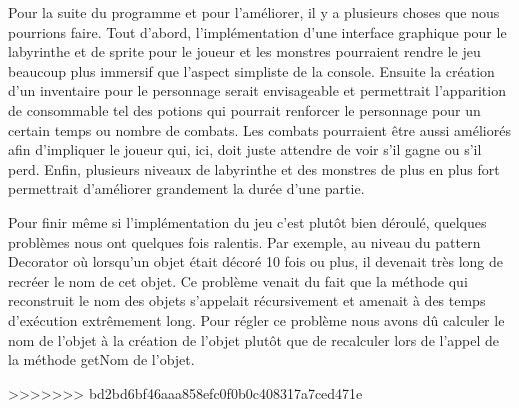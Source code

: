 \documentclass[a4paper]{article}
\begin{document}
Pour la suite du programme et pour l'améliorer, il y a plusieurs choses que nous pourrions faire.
Tout d'abord, l'implémentation d'une interface graphique pour le labyrinthe et de sprite pour le joueur et les monstres pourraient rendre le jeu beaucoup plus immersif que l'aspect simpliste de la console.
Ensuite la création d'un inventaire pour le personnage serait envisageable et permettrait l'apparition de consommable tel des potions qui pourrait renforcer le personnage pour un certain temps ou nombre de combats.
Les combats pourraient être aussi améliorés afin d'impliquer le joueur qui, ici, doit juste attendre de voir s’il gagne ou s’il perd.
Enfin, plusieurs niveaux de labyrinthe et des monstres de plus en plus fort permettrait d'améliorer grandement la durée d'une partie.

Pour finir même si l'implémentation du jeu c'est plutôt bien déroulé, quelques problèmes nous ont quelques fois ralentis.
Par exemple, au niveau du pattern Decorator où lorsqu'un objet était décoré 10 fois ou plus, il devenait très long de recréer le nom de cet objet.
Ce problème venait du fait que la méthode qui reconstruit le nom des objets s'appelait récursivement et amenait à des temps d'exécution extrêmement long.
Pour régler ce problème nous avons dû calculer le nom de l'objet à la création de l'objet plutôt que de recalculer lors de l'appel de la méthode getNom de l'objet.


>>>>>>> bd2bd6bf46aaa858efc0f0b0c408317a7ced471e
\end{document}
